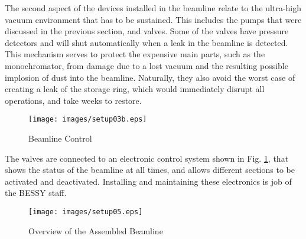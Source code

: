 \documentclass[a4paper,10pt]{article}
\begin{document}
    The second aspect of the devices installed in the beamline relate to the
ultra-high vacuum environment that has to be sustained. This includes the pumps
that were discussed in the previous section, and valves. Some of the valves
have pressure detectors and will shut automatically when a leak in the beamline
is detected. This mechanism serves to protect the expensive main parts, such as
the monochromator, from damage due to a lost vacuum and the resulting
possible implosion of dust into the beamline. Naturally, they also avoid the
worst case of creating a leak of the storage ring, which would immediately
disrupt all operations, and take weeks to restore.


\begin{figure}[htbp]
    \centering
      \texttt{[image: images/setup03b.eps]}
    \caption{Beamline Control}
  \label{image:setup03b}
\end{figure}

    The valves are connected to an electronic control system shown in Fig.
\ref{image:setup03b}, that shows the status of the beamline at all times, and
allows different sections to be activated and deactivated. Installing and
maintaining these electronics is job of the BESSY staff.

\begin{figure}[!h]
    \centering
    \texttt{[image: images/setup05.eps]}
    \caption{Overview of the Assembled Beamline}
  \label{image:setup05}
\end{figure}

\appendix


\clearpage


\end{document}
